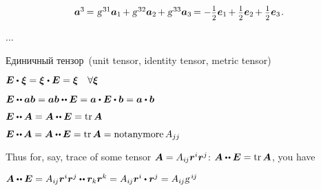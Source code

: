 \begin{otherlanguage}{russian}
\begin{tcolorbox}
\[\begin{array}{l}
%
\bm{a}^3 \hspace{-0.2ex}=\hspace{.1ex} \textsl{g}^{\hspace{.2ex}31} \bm{a}_1 \hspace{-0.2ex} + \textsl{g}^{\hspace{.2ex}32} \bm{a}_2 \hspace{-0.2ex} + \textsl{g}^{\hspace{.2ex}33} \bm{a}_3 \hspace{-0.2ex} = - \smalldisplaystyleonehalf \bm{e}_1 \hspace{-0.2ex} + \smalldisplaystyleonehalf \bm{e}_2 \hspace{-0.2ex} + \smalldisplaystyleonehalf \bm{e}_3 \hspace{.16ex}.
\end{array}\]

\par\end{tcolorbox}

...


Единичный тензор~(unit tensor, identity tensor,  metric tensor)

$\bm{E} \dotp \hspace{0.1ex} \bm{\xi} = \bm{\xi} \hspace{0.1ex} \dotp \bm{E} = \bm{\xi} \quad \forall \bm{\xi}$

$\bm{E} \dotdotp \bm{a} \bm{b} = \bm{a} \bm{b} \dotdotp \bm{E} = \bm{a} \dotp \bm{E} \dotp \bm{b} = \bm{a} \dotp \bm{b}$

$\bm{E} \dotdotp \bm{A} = \bm{A} \dotdotp \bm{E} = \operatorname{tr} \bm{A}$


$\bm{E} \dotdotp \hspace{-0.1ex} \bm{A} = \bm{A} \dotdotp \hspace{-0.1ex} \bm{E} = \operatorname{tr} \bm{A} = \operatorname{not anymore} A_{jj}$

Thus for, say, trace of some tensor ${\bm{A} = A_{i\hspace{-0.1ex}j} \bm{r}^i \bm{r}^j}$: $\bm{A} \dotdotp \bm{E} = \operatorname{tr} \bm{A}$, you have

$\bm{A} \dotdotp \bm{E} = A_{i\hspace{-0.1ex}j} \bm{r}^i \bm{r}^j \dotdotp \bm{r}_k \bm{r}^k = A_{i\hspace{-0.1ex}j} \bm{r}^i \dotp \bm{r}^j = A_{i\hspace{-0.1ex}j} \textsl{g}^{\hspace{.32ex}i\hspace{-0.1ex}j}$



\end{otherlanguage}

